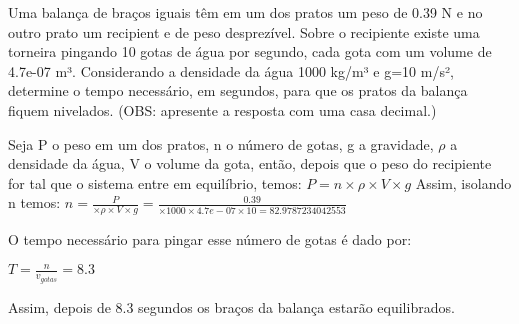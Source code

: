 
\begin{question}
Uma balança de braços iguais t\^em em um dos pratos um peso de 0.39 N 
e no outro prato um recipient e de peso desprezível. Sobre o recipiente existe 
uma torneira pingando 10 gotas de água por segundo, cada gota com
um volume de 4.7e-07 m³. Considerando a densidade da água 
1000 kg/m³ e g=10 m/s², determine o tempo necessário, 
em segundos, para que os pratos da balança fiquem nivelados. (OBS: apresente a resposta com uma casa decimal.)

\end{question}

\begin{solution}
Seja P o peso em um dos pratos, n o n\'umero de gotas, g a gravidade, $\rho$ a densidade da \'agua, V o volume da gota,  ent\~ao, depois que o peso do recipiente for tal que o sistema entre em equil\'ibrio, temos:
$P = n \times \rho \times V \times g $
Assim, isolando n temos:
$n =  \frac{P}{\times \rho \times V \times g} = \frac{0.39}{\times 1000 \times 4.7e-07 \times 10 = 82.9787234042553}$

O tempo necess\'ario para pingar esse n\'umero de gotas \'e dado por:

$T = \frac{n}{v_{gotas}} = 8.3$

Assim, depois de 8.3 segundos os braços da balança estarão equilibrados.
\end{solution}

